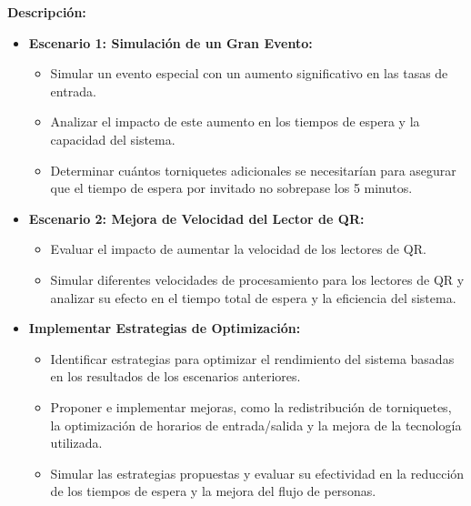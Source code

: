 \documentclass[12pt]{article}
\begin{document}
\textbf{Descripción:}
\begin{itemize}
    \item \textbf{Escenario 1: Simulación de un Gran Evento:}
    \begin{itemize}
        \item Simular un evento especial con un aumento significativo en las tasas de entrada.
        \item Analizar el impacto de este aumento en los tiempos de espera y la capacidad del sistema.
        \item Determinar cuántos torniquetes adicionales se necesitarían para asegurar que el tiempo de espera por invitado no sobrepase los 5 minutos.
    \end{itemize}
    
    \item \textbf{Escenario 2: Mejora de Velocidad del Lector de QR:}
    \begin{itemize}
        \item Evaluar el impacto de aumentar la velocidad de los lectores de QR.
        \item Simular diferentes velocidades de procesamiento para los lectores de QR y analizar su efecto en el tiempo total de espera y la eficiencia del sistema.
    \end{itemize}
    
    \item \textbf{Implementar Estrategias de Optimización:}
    \begin{itemize}
        \item Identificar estrategias para optimizar el rendimiento del sistema basadas en los resultados de los escenarios anteriores.
        \item Proponer e implementar mejoras, como la redistribución de torniquetes, la optimización de horarios de entrada/salida y la mejora de la tecnología utilizada.
        \item Simular las estrategias propuestas y evaluar su efectividad en la reducción de los tiempos de espera y la mejora del flujo de personas.
    \end{itemize}
\end{itemize}
\end{document}
